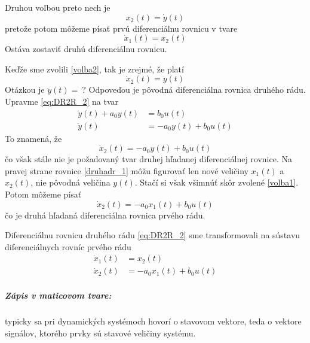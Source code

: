 \documentclass[a4paper, 10pt, ]{article}
\begin{document}
Druhou voľbou preto nech je
\begin{equation} \label{volba2}
    x_2(t) = \dot y(t)
\end{equation}
pretože potom môžeme písať prvú diferenciálnu rovnicu v tvare
\begin{equation}
    \dot x_1(t) = x_2(t)
\end{equation}
Ostáva zostaviť druhú diferenciálnu rovnicu. 

Keďže sme zvolili \eqref{volba2}, tak je zrejmé, že platí
\begin{equation} 
    \dot x_2(t) = \ddot y(t)
\end{equation}
Otázkou je $\ddot y(t) = \ ?$ Odpoveďou je pôvodná diferenciálna rovnica druhého rádu. Upravme \eqref{eq:DR2R_2} na tvar
\begin{align}
    \ddot y(t)  + a_0 y(t) &= b_0 u(t) \\
    \ddot y(t) &=  - a_0 y(t) +  b_0 u(t) 
\end{align}
To znamená, že
\begin{equation}  \label{druhadr_1}
    \dot x_2(t) =  - a_0 y(t) +  b_0 u(t) 
\end{equation}
čo však stále nie je požadovaný tvar druhej hľadanej diferenciálnej rovnice. Na pravej strane rovnice \eqref{druhadr_1} môžu figurovať len nové veličiny $x_1(t)$ a $x_2(t)$, nie pôvodná veličina $y(t)$. Stačí si však všimnúť skôr zvolené \eqref{volba1}. Potom môžeme písať
\begin{equation}  \label{druhadr_2}
    \dot x_2(t) =  - a_0 x_1(t) +  b_0 u(t) 
\end{equation}
čo je druhá hľadaná diferenciálna rovnica prvého rádu.

Diferenciálnu rovnicu druhého rádu \eqref{eq:DR2R_2} sme transformovali na sústavu diferenciálnych rovníc prvého rádu
\begin{subequations} \label{druhadr_sustava}
\begin{align}
    \dot x_1(t) &= x_2(t) \\
    \dot x_2(t) &=  - a_0 x_1(t) +  b_0 u(t) 
\end{align}
\end{subequations}

\subparagraph{Zápis v maticovom tvare:}

typicky sa pri dynamických systémoch hovorí o stavovom vektore, teda o vektore signálov, ktorého prvky sú stavové veličiny systému. 
\end{document}
